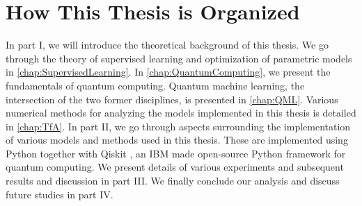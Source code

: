 \section{How This Thesis is Organized}
In part I, we will introduce the theoretical background of this thesis. We go through the theory of supervised learning and optimization of parametric models in \autoref{chap:SupervisedLearning}. In \autoref{chap:QuantumComputing}, we present the fundamentals of quantum computing. Quantum machine learning, the intersection of the two former disciplines, is presented in \autoref{chap:QML}. Various numerical methods for analyzing the models implemented in this thesis is detailed in \autoref{chap:TfA}. In part II, we go through aspects surrounding the implementation of various models and methods used in this thesis. These are implemented using Python together with Qiskit \cite{Qiskit}, an IBM made open-source Python framework for quantum computing. We present details of various experiments and subsequent results and discussion in part III. We finally conclude our analysis and discuss future studies in part IV.

